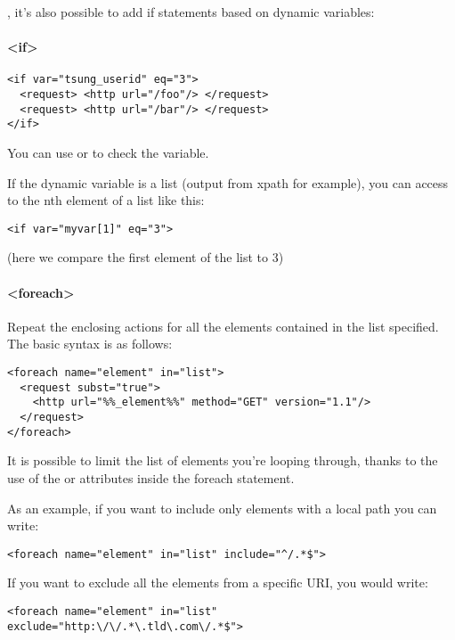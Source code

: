 \documentclass{TSUNG-en}
\begin{document}
, it's also possible to add if statements based on
dynamic variables:
\paragraph{<if>}

\begin{Verbatim}
<if var="tsung_userid" eq="3">
  <request> <http url="/foo"/> </request>
  <request> <http url="/bar"/> </request>
</if>
\end{Verbatim}

You can use  or  to check the variable.

If the dynamic variable is a list (output from xpath for example), you
can access to the nth element of a list like this:
\begin{Verbatim}
<if var="myvar[1]" eq="3">
\end{Verbatim}
(here we compare the first element of the list to 3)

\paragraph{<foreach>}

Repeat the enclosing actions for all the elements contained in the list specified. The basic syntax is as follows:

\begin{Verbatim}
<foreach name="element" in="list">
  <request subst="true">
    <http url="%%_element%%" method="GET" version="1.1"/>
  </request>
</foreach>
\end{Verbatim}

It is possible to limit the list of elements you're looping through, thanks to the use of the  or  attributes inside the foreach statement.

As an example, if you want to include only elements with a local path you can write:

\begin{Verbatim}
<foreach name="element" in="list" include="^/.*$">
\end{Verbatim}

If you want to exclude all the elements from a specific URI, you would write:

\begin{Verbatim}
<foreach name="element" in="list" exclude="http:\/\/.*\.tld\.com\/.*$">
\end{Verbatim}
\end{document}
